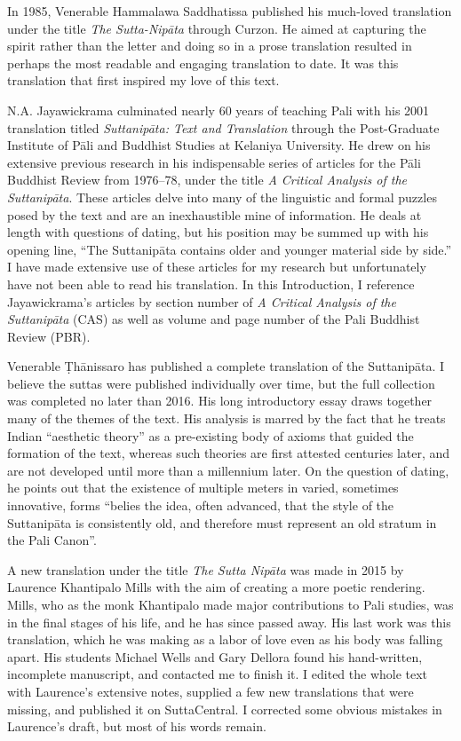 \documentclass[12pt,openany]{book}%
\begin{document}
In 1985, Venerable Hammalawa Saddhatissa published his much-loved translation under the title \textit{The Sutta-\textsanskrit{Nipāta}} through Curzon. He aimed at capturing the spirit rather than the letter and doing so in a prose translation resulted in perhaps the most readable and engaging translation to date. It was this translation that first inspired my love of this text.

N.A. Jayawickrama culminated nearly 60 years of teaching Pali with his 2001 translation titled \textit{\textsanskrit{Suttanipāta}: Text and Translation} through the Post-Graduate Institute of \textsanskrit{Pāli} and Buddhist Studies at Kelaniya University. He drew on his extensive previous research in his indispensable series of articles for the \textsanskrit{Pāli} Buddhist Review from 1976–78, under the title \textit{A Critical Analysis of the \textsanskrit{Suttanipāta}}. These articles delve into many of the linguistic and formal puzzles posed by the text and are an inexhaustible mine of information. He deals at length with questions of dating, but his position may be summed up with his opening line, “The \textsanskrit{Suttanipāta} contains older and younger material side by side.” I have made extensive use of these articles for my research but unfortunately have not been able to read his translation. In this Introduction, I reference Jayawickrama’s articles by section number of \textit{A Critical Analysis of the \textsanskrit{Suttanipāta}} (CAS) as well as volume and page number of the Pali Buddhist Review (PBR).

Venerable \textsanskrit{Ṭhānissaro} has published a complete translation of the \textsanskrit{Suttanipāta}. I believe the suttas were published individually over time, but the full collection was completed no later than 2016. His long introductory essay draws together many of the themes of the text. His analysis is marred by the fact that he treats Indian “aesthetic theory” as a pre-existing body of axioms that guided the formation of the text, whereas such theories are first attested centuries later, and are not developed until more than a millennium later. On the question of dating, he points out that the existence of multiple meters in varied, sometimes innovative, forms “belies the idea, often advanced, that the style of the \textsanskrit{Suttanipāta} is consistently old, and therefore must represent an old stratum in the Pali Canon”.

A new translation under the title \textit{The Sutta \textsanskrit{Nipāta}} was made in 2015 by Laurence Khantipalo Mills with the aim of creating a more poetic rendering. Mills, who as the monk Khantipalo made major contributions to Pali studies, was in the final stages of his life, and he has since passed away. His last work was this translation, which he was making as a labor of love even as his body was falling apart. His students Michael Wells and Gary Dellora found his hand-written, incomplete manuscript, and contacted me to finish it. I edited the whole text with Laurence’s extensive notes, supplied a few new translations that were missing, and published it on SuttaCentral. I corrected some obvious mistakes in Laurence’s draft, but most of his words remain.
\end{document}
